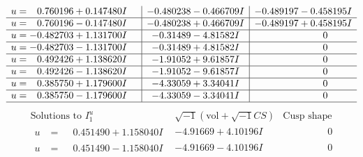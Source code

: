 \documentclass[1p]{elsarticle_modified}
\theoremstyle{definition}
\newcommand{\I}{\sqrt{-1}}
\begin{document}
$$\begin{array}{c|c|c}
\begin{aligned}
u &= \phantom{-}0.760196 + 0.147480 I\end{aligned}
 & -0.480238 - 0.466709 I & -0.489197 - 0.458195 I \\ \hline\begin{aligned}
u &= \phantom{-}0.760196 - 0.147480 I\end{aligned}
 & -0.480238 + 0.466709 I & -0.489197 + 0.458195 I \\ \hline\begin{aligned}
u &= -0.482703 + 1.131700 I\end{aligned}
 & -0.31489 - 4.81582 I & \phantom{-0.000000 } 0 \\ \hline\begin{aligned}
u &= -0.482703 - 1.131700 I\end{aligned}
 & -0.31489 + 4.81582 I & \phantom{-0.000000 } 0 \\ \hline\begin{aligned}
u &= \phantom{-}0.492426 + 1.138620 I\end{aligned}
 & -1.91052 + 9.61857 I & \phantom{-0.000000 } 0 \\ \hline\begin{aligned}
u &= \phantom{-}0.492426 - 1.138620 I\end{aligned}
 & -1.91052 - 9.61857 I & \phantom{-0.000000 } 0 \\ \hline\begin{aligned}
u &= \phantom{-}0.385750 + 1.179600 I\end{aligned}
 & -4.33059 + 3.34041 I & \phantom{-0.000000 } 0 \\ \hline\begin{aligned}
u &= \phantom{-}0.385750 - 1.179600 I\end{aligned}
 & -4.33059 - 3.34041 I & \phantom{-0.000000 } 0\\
 \hline 
 \end{array}$$\newpage$$\begin{array}{c|c|c}  
\text{Solutions to }I^u_{1}& \I (\text{vol} + \sqrt{-1}CS) & \text{Cusp shape}\\
 \hline 
\begin{aligned}
u &= \phantom{-}0.451490 + 1.158040 I\end{aligned}
 & -4.91669 + 4.10196 I & \phantom{-0.000000 } 0 \\ \hline\begin{aligned}
u &= \phantom{-}0.451490 - 1.158040 I\end{aligned}
 & -4.91669 - 4.10196 I & \phantom{-0.000000 } 0 \\ \hline\begin{aligned}

\end{aligned}
\end{array}$$
\end{document}

